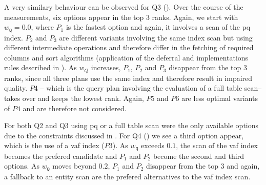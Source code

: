 A very similary behaviour can be observed for Q3 (). Over the course of the measurements, six options appear in the top $3$ ranks. Again, we start with  $w_{\mathtt{Q}} = 0.0$, where $P_1$ is the fastest option and again, it involves a scan of the \acrshort{pq} index. $P_2$ and $P_3$ are different variants involving the same index scan but using different intermediate operations and therefore differ in the fetching of required columns and sort algorithms (application of the deferral and implementations rules described in ). As $w_Q$ increases, $P_1$, $P_2$ and $P_3$ disappear from the top $3$ ranks, since all three plans use the same index and therefore result in impaired quality. $P4$ -- which is the query plan involving the evaluation of a full table scan-- takes over and keeps the lowest rank. Again, $P5$ and $P6$ are less optimal variants of $P4$ and are therefore not considered.

For both Q2 and Q3 using \acrshort{pq} or a full table scan were the only available options due to the constraints discussed in . For Q4 () we see a third option appear, which is the use of a \acrshort{vaf} index ($P3$). As $w_{\mathtt{Q}}$ exceeds $0.1$, the scan of the \acrshort{vaf} index becomes the prefered candidate and $P_1$ and $P_2$ become the second and third options. As  $w_{\mathtt{Q}}$ moves beyond $0.2$, $P_1$ and $P_2$ disappear from the top 3 and again, a fallback to an entity scan are the prefered alternatives to the \acrshort{vaf} index scan.

